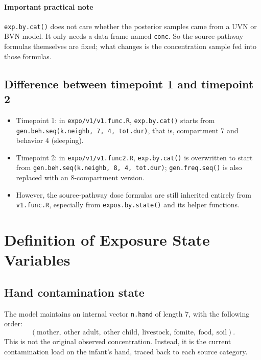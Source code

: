 \documentclass[11pt]{article}
\begin{document}
\paragraph{Important practical note}
\texttt{exp.by.cat()} does not care whether the posterior samples came from a UVN or BVN model. It only needs a data frame named \texttt{conc}. So the source-pathway formulas themselves are fixed; what changes is the concentration sample fed into those formulas.

\subsection{Difference between timepoint 1 and timepoint 2}
\begin{itemize}[leftmargin=2em]
  \item Timepoint 1: in \texttt{expo/v1/v1.func.R}, \texttt{exp.by.cat()} starts from \texttt{gen.beh.seq(k.neighb, 7, 4, tot.dur)}, that is, compartment 7 and behavior 4 (sleeping).
  \item Timepoint 2: in \texttt{expo/v1/v1.func2.R}, \texttt{exp.by.cat()} is overwritten to start from \texttt{gen.beh.seq(k.neighb, 8, 4, tot.dur)}; \texttt{gen.freq.seq()} is also replaced with an 8-compartment version.
  \item However, the source-pathway dose formulas are still inherited entirely from \texttt{v1.func.R}, especially from \texttt{expos.by.state()} and its helper functions.
\end{itemize}

\section{Definition of Exposure State Variables}
\subsection{Hand contamination state}
The model maintains an internal vector \texttt{n.hand} of length 7, with the following order:
\[
(\text{mother},\ \text{other adult},\ \text{other child},\ \text{livestock},\ \text{fomite},\ \text{food},\ \text{soil}).
\]
This is not the original observed concentration. Instead, it is the current contamination load on the infant's hand, traced back to each source category.
\end{document}
